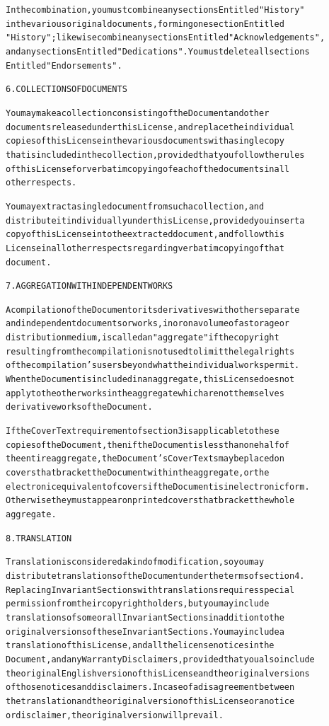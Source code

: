 \documentclass[DIV=12,%
               BCOR=0mm,%
               fontsize=10pt,%
               oneside,%
               paper=210mm:11in]{scrbook}
\begin{document}
\begin{alltt}
In the combination, you must combine any sections Entitled "History"
in the various original documents, forming one section Entitled
"History"; likewise combine any sections Entitled "Acknowledgements",
and any sections Entitled "Dedications".  You must delete all sections
Entitled "Endorsements".


6. COLLECTIONS OF DOCUMENTS

You may make a collection consisting of the Document and other
documents released under this License, and replace the individual
copies of this License in the various documents with a single copy
that is included in the collection, provided that you follow the rules
of this License for verbatim copying of each of the documents in all
other respects.

You may extract a single document from such a collection, and
distribute it individually under this License, provided you insert a
copy of this License into the extracted document, and follow this
License in all other respects regarding verbatim copying of that
document.


7. AGGREGATION WITH INDEPENDENT WORKS

A compilation of the Document or its derivatives with other separate
and independent documents or works, in or on a volume of a storage or
distribution medium, is called an "aggregate" if the copyright
resulting from the compilation is not used to limit the legal rights
of the compilation's users beyond what the individual works permit.
When the Document is included in an aggregate, this License does not
apply to the other works in the aggregate which are not themselves
derivative works of the Document.

If the Cover Text requirement of section 3 is applicable to these
copies of the Document, then if the Document is less than one half of
the entire aggregate, the Document's Cover Texts may be placed on
covers that bracket the Document within the aggregate, or the
electronic equivalent of covers if the Document is in electronic form.
Otherwise they must appear on printed covers that bracket the whole
aggregate.


8. TRANSLATION

Translation is considered a kind of modification, so you may
distribute translations of the Document under the terms of section 4.
Replacing Invariant Sections with translations requires special
permission from their copyright holders, but you may include
translations of some or all Invariant Sections in addition to the
original versions of these Invariant Sections.  You may include a
translation of this License, and all the license notices in the
Document, and any Warranty Disclaimers, provided that you also include
the original English version of this License and the original versions
of those notices and disclaimers.  In case of a disagreement between
the translation and the original version of this License or a notice
or disclaimer, the original version will prevail.


\end{alltt}
\end{document}
